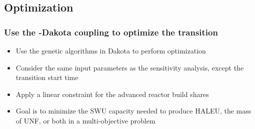 \subsection{Optimization}
\begin{frame}
    \frametitle{Use the \Cyclus-Dakota coupling to optimize the transition}
    \begin{itemize}
        \item Use the genetic algorithms in Dakota to perform optimization
        \item Consider the same input parameters as the sensitivity analysis, 
              except the transition start time
        \item<2-> Apply a linear constraint for the advanced reactor build shares
        \item<3-> Goal is to minimize the SWU capacity needed to 
             produce HALEU, the mass of \gls{UNF}, or both in a multi-objective 
             problem
    \end{itemize}
\end{frame}

